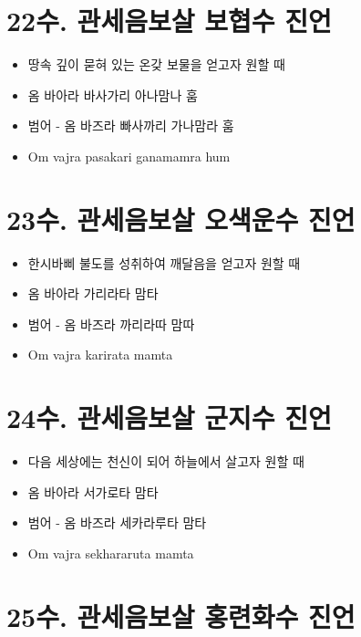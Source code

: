 \documentclass[12pt, a4paper, oneside]{book}
\let\stdsection\section
\renewcommand\section{\newpage\stdsection}
\begin{document}
\section{22수. 관세음보살 보협수 진언}

			\begin{itemize}
			\item 땅속 깊이 묻혀 있는 온갖 보물을 얻고자 원할 때
			\item 옴 바아라 바사가리 아나맘나 훔
			\item 범어 - 옴 바즈라 빠사까리 가나맘라 훔
			\item Om vajra pasakari ganamamra hum
			\end{itemize}





\section{23수. 관세음보살 오색운수 진언}

			\begin{itemize}
			\item 한시바삐 불도를 성취하여 깨달음을 얻고자 원할 때
			\item 옴 바아라 가리라타 맘타
			\item 범어 - 옴 바즈라 까리라따 맘따
			\item Om vajra karirata mamta
			\end{itemize}





\section{24수. 관세음보살 군지수 진언}

			\begin{itemize}
			\item 다음 세상에는 천신이 되어 하늘에서 살고자 원할 때
			\item 옴 바아라 서가로타 맘타
			\item 범어 - 옴 바즈라 세카라루타 맘타
			\item Om vajra sekhararuta mamta
			\end{itemize}



\section{25수. 관세음보살 홍련화수 진언}
\end{document}
